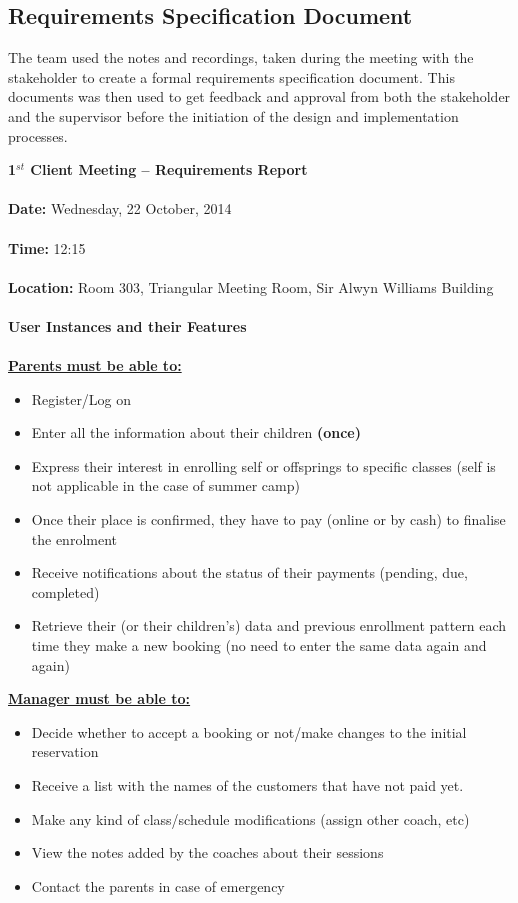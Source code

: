 \documentclass{l3proj}
\begin{document}
\subsection{Requirements Specification Document}
\par
The team used the notes and recordings, taken during the meeting with the stakeholder to create a formal requirements specification document. This documents was then used to get feedback and approval from both the stakeholder and the supervisor before the initiation of the design and implementation processes.

\textbf{\LARGE{1$^{st}$ Client Meeting -- Requirements Report}}\\
\\
\textbf{Date:} Wednesday, 22 October, 2014\\
\\
\textbf{Time:} 12:15\\
\\
\textbf{Location:} Room 303, Triangular Meeting Room, Sir Alwyn Williams Building\\
\\
\textbf{\Large{User Instances and their Features}}\\
\\
\textbf{\underline{Parents must be able to:}}
	\begin{itemize}
	\item Register/Log on
	\item Enter all the information about their children \textbf{(once)}
	\item Express their interest in enrolling self or offsprings to specific classes (self is not applicable in the case of summer camp)
	\item Once their place is confirmed, they have to pay (online or by cash) to finalise the enrolment
	\item Receive notifications about the status of their payments (pending, due, completed)
	\item Retrieve their (or their children’s) data and previous enrollment pattern each time they make a new booking (no need to enter the same data again and again)
	\end{itemize}
\textbf{\underline{Manager must be able to:}}
	\begin{itemize}
	\item Decide whether to accept a booking or not/make changes to the initial reservation
	\item Receive a list with the names of the customers that have not paid yet.
	\item Make any kind of class/schedule modifications (assign other coach, etc)
	\item View the notes added by the coaches about their sessions
	\item Contact the parents in case of emergency
	\end{itemize}
\end{document}
